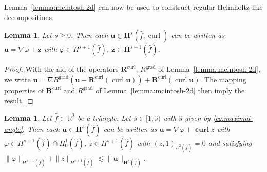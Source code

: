 \documentclass{article}
\newtheorem{lemma}[theorem]{Lemma}
\begin{document}
Lemma~\ref{lemma:mcintosh-2d} can now be used to construct regular Helmholtz-like decompositions.

\begin{lemma}
\label{lemma:helmholtz-like-decomp-2d} Let $s \ge0$. Then each ${\mathbf{u}}
\in{\mathbf{H}}^{s}(\widehat{f},\operatorname*{curl})$ can be written as
${\mathbf{u}} = \nabla\varphi+ {\mathbf{z}}$ with $\varphi\in H^{s+1}%
(\widehat{f})$, ${\mathbf{z}} \in{\mathbf{H}}^{s+1}(\widehat{f})$.
\end{lemma}

\begin{proof}
With the aid of the operators ${\mathbf{R}}^{\operatorname*{curl}}$,
$R^{\operatorname*{grad}}$ of Lemma~\ref{lemma:mcintosh-2d}, we write
$\displaystyle 
{\mathbf{u}}=\nabla R^{\operatorname*{grad}}({\mathbf{u}}-{\mathbf{R}%
}^{\operatorname*{curl}}(\operatorname*{curl}{\mathbf{u}}))+{\mathbf{R}%
}^{\operatorname*{curl}}(\operatorname*{curl}{\mathbf{u}}).
$
The mapping properties of ${\mathbf{R}}^{\operatorname*{curl}}$ and
$R^{\operatorname*{grad}}$ of Lemma~\ref{lemma:mcintosh-2d} then imply the result.
\end{proof}
\begin{lemma}
\label{lemma:helmholtz-like-decomp-2d-v2} Let $\widehat f \subset {\mathbb R}^2$
be a triangle.  Let $s \in [1,\widehat{s})$ with 
$\widehat{s}$ given by \eqref{eq:maximal-angle}.
Then each ${\mathbf{u}}
\in{\mathbf{H}}^{s}(\widehat{f})$ can be written as
${\mathbf{u}} = \nabla\varphi+ \operatorname{\mathbf{curl}}z$ with 
$\varphi\in H^{s+1}(\widehat{f}) \cap H^1_0(\widehat{f})$, 
$z\in H^{s+1}(\widehat{f})$ with $(z,1)_{L^2(\widehat f)} = 0$ and 
satisfying $\|\varphi\|_{H^{s+1}(\widehat{f})} + \|z\|_{H^{s+1}(\widehat{f})} \lesssim \|\mathbf{u}\|_{\mathbf{H}^s(\widehat{f})}$.%
\end{lemma}
\end{document}
